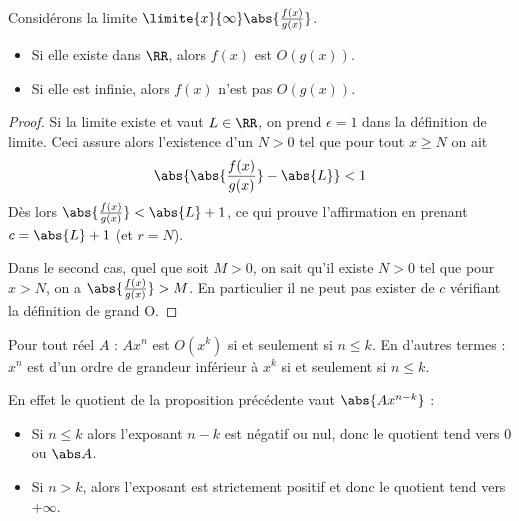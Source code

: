 \begin{frame}%
\begin{proposition}
  Considérons la limite \(\limite{x}{\infty} \abs{\frac{f(x)}{g(x)}}\).
  \begin{itemize}
  \item Si elle existe dans \(\RR\), alors \(f(x)\) est \(O(g(x))\).
  \item Si elle est infinie, alors \(f(x)\) n'est pas \(O(g(x))\).
\end{itemize}
\end{proposition}
\begin{proof}
  Si la limite existe et vaut \(L\in \RR\), on prend \(\epsilon = 1\) dans la définition de limite. Ceci assure alors l'existence d'un \(N > 0\) tel que pour tout \(x \geq N\) on ait
  \begin{equation*}
    \abs{\abs{\frac{f(x)}{g(x)}} - \abs{L}} < 1
  \end{equation*}
  Dès lors \(\abs{\frac{f(x)}{g(x)}} < \abs{L} + 1\), ce qui prouve l'affirmation en prenant \(c = \abs{L} + 1\) (et \(r = N\)).

  Dans le second cas, quel que soit \(M > 0\), on sait qu'il existe \(N > 0\) tel  que pour \(x > N\), on a \(\abs{\frac{f(x)}{g(x)}} > M\). En particulier il ne peut pas exister de \(c\) vérifiant la définition de \og grand O\fg{}.
\end{proof}
\end{frame}
\begin{frame}%
  \begin{example}
    Pour tout réel \(A\) : \(A x^{n}\) est \(O(x^{k})\) si et seulement si \(n \leq k\). En d'autres termes : \(x^{n}\) est d'un ordre de grandeur inférieur à \(x^{k}\) si et seulement si \(n \leq k\).

    En effet le quotient de la proposition précédente vaut \(\abs{A x^{n-k}}\) :
    \begin{itemize}
    \item Si \(n \leq k\) alors l'exposant \(n-k\) est négatif ou nul, donc le quotient tend vers \(0\) ou \(\abs A\).
    \item Si \(n > k\), alors l'exposant est strictement positif et donc le quotient tend vers \(+\infty\).
    \end{itemize}
  \end{example}
\end{frame}

